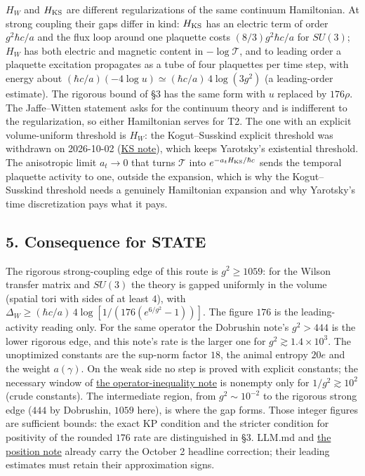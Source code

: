 \documentclass[11pt,a4paper]{article}
\begin{document}
\(H_W\) and \(H_{\rm KS}\) are different regularizations of the same
continuum Hamiltonian. At strong coupling their gaps differ in kind:
\(H_{\rm KS}\) has an electric term of order \(g^2\hbar c/a\) and the
flux loop around one plaquette costs \((8/3)g^2\hbar c/a\) for
\(SU(3)\); \(H_W\) has both electric and magnetic content in
\(-\log\mathcal T\), and to leading order a plaquette excitation
propagates as a tube of four plaquettes per time step, with energy about
\((\hbar c/a)(-4\log u)\simeq(\hbar c/a)\,4\log(3g^2)\) (a leading-order
estimate). The rigorous bound of §3 has the same form with \(u\)
replaced by \(176\rho\). The Jaffe--Witten statement asks for the
continuum theory and is indifferent to the regularization, so either
Hamiltonian serves for T2. The one with an explicit volume-uniform
threshold is \(H_W\): the Kogut--Susskind explicit threshold was
withdrawn on 2026-10-02
(\href{strong-coupling-uniform-gap.md\#continuous-time-histories-and-the-corrected-overlap-criterion}{KS
note}), which keeps Yarotsky's existential threshold. The anisotropic
limit \(a_t\to0\) that turns \(\mathcal T\) into
\(e^{-a_tH_{\rm KS}/\hbar c}\) sends the temporal plaquette activity to
one, outside the expansion, which is why the Kogut--Susskind threshold
needs a genuinely Hamiltonian expansion and why Yarotsky's time
discretization pays what it pays.

\hypertarget{consequence-for-state}{%
\subsection{5. Consequence for STATE}\label{consequence-for-state}}

The rigorous strong-coupling edge of this route is \(g^2\ge1059\): for
the Wilson transfer matrix and \(SU(3)\) the theory is gapped uniformly
in the volume (spatial tori with sides of at least \(4\)), with
\(\Delta_W\ge(\hbar c/a)\,4\log[1/(176(e^{6/g^2}-1))]\). The figure
\(176\) is the leading-activity reading only. For the same operator the
Dobrushin note's \(g^2>444\) is the lower rigorous edge, and this note's
rate is the larger one for \(g^2\gtrsim1.4\times10^3\). The unoptimized
constants are the sup-norm factor \(18\), the animal entropy \(20e\) and
the weight \(a(\gamma)\). On the weak side no step is proved with
explicit constants; the necessary window of
\href{large-field-operator-inequality.md}{the operator-inequality note}
is nonempty only for \(1/g^2\gtrsim10^2\) (crude constants). The
intermediate region, from \(g^2\sim10^{-2}\) to the rigorous strong edge
(\(444\) by Dobrushin, \(1059\) here), is where the gap forms. Those
integer figures are sufficient bounds: the exact KP condition and the
stricter condition for positivity of the rounded \(176\) rate are
distinguished in §3. LLM.md and
\href{mass-gap-obligations-lattice.md\#existing-estimates-and-examined-routes}{the
position note} already carry the October 2 headline correction; their
leading estimates must retain their approximation signs.
\end{document}

